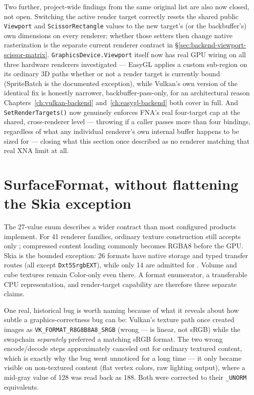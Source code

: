 Two further, project-wide findings from the same original list are also now closed, not open.
Switching the active render target correctly resets the shared public \texttt{Viewport} and
\texttt{Scissor\allowbreak{}Rectangle} values to the new target's (or the backbuffer's) own
dimensions on every renderer; whether those setters then change native rasterization is the separate
current renderer contract in \S\ref{sec:backend-viewport-scissor-matrix}.
\texttt{GraphicsDevice.Viewport} itself now has real GPU wiring on all three
hardware renderers investigated --- EasyGL applies a custom sub-region 
on its ordinary 3D paths whether or not a render target is currently bound (SpriteBatch is the
documented exception), while Vulkan's own version
of the identical fix is honestly narrower, backbuffer-pass-only, for an architectural reason
Chapters~\ref{ch:vulkan-backend} and~\ref{ch:easygl-backend} both cover in full. And
\texttt{SetRenderTargets()} now genuinely enforces FNA's real four-target cap at the shared,
cross-renderer level --- throwing if a caller passes more than four bindings, regardless of
what any individual renderer's own internal buffer happens to be sized for --- closing what
this section once described as no renderer matching that real XNA limit at all.

\section{SurfaceFormat, without flattening the Skia exception}

The 27-value  enum describes a wider contract than most configured
products implement. For 41 renderer families, ordinary texture construction still accepts only
; compressed content loading commonly becomes RGBA8 before the GPU.
Skia is the bounded exception: 26 formats have native  storage and typed
transfer routes (all except \texttt{Dxt5SrgbEXT}), while only 14 are admitted for
. Volume and cube
textures remain Color-only even there. A format enumerator, a transferable CPU representation,
and render-target capability are therefore three separate claims.

One real, historical
bug is worth naming because of what it reveals about how subtle a graphics-correctness bug
can be: Vulkan's texture path once created images as \texttt{VK\_FORMAT\_R8G8B8A8\_SRGB}
(wrong ---  is linear, not sRGB) while the swapchain
\emph{separately} preferred a matching sRGB format. The two wrong encode/decode steps
approximately canceled out for ordinary textured content, which is exactly why the bug went
unnoticed for a long time --- it only became visible on non-textured content (flat vertex
colors, raw lighting output), where a mid-gray value of 128 was read back as 188. Both were
corrected to their \texttt{\_UNORM} equivalents.

